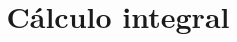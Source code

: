 \documentclass[12pt]{article}
\theoremstyle{normal}
\theoremstyle{break}
\theoremstyle{breakthm}
\begin{document}
\date{}

\title{Cálculo integral} %

\maketitle

\tableofcontents


\end{document}
